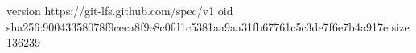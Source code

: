 version https://git-lfs.github.com/spec/v1
oid sha256:90043358078f9ceca8f9e8c0fd1c5381aa9aa31fb67761c5c3de7f6e7b4a917e
size 136239
